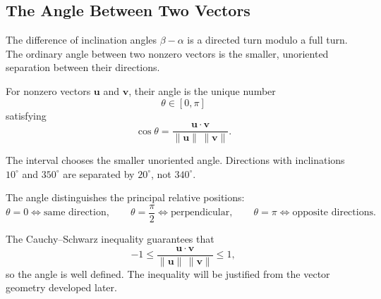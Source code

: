 \subsection{The Angle Between Two Vectors}

\begin{corebox}
The difference of inclination angles $\beta-\alpha$ is a directed turn modulo a
full turn. The ordinary angle between two nonzero vectors is the smaller,
unoriented separation between their directions.
\end{corebox}

\begin{definitionbox}
For nonzero vectors $\mathbf u$ and $\mathbf v$, their angle is the unique number
\[
\theta\in[0,\pi]
\]
satisfying
\[
\boxed{
\cos\theta
=
\frac{\mathbf u\cdot\mathbf v}
{\|\mathbf u\|\,\|\mathbf v\|}
}.
\]
\end{definitionbox}

\begin{interpretationbox}
The interval chooses the smaller unoriented angle. Directions with inclinations
$10^\circ$ and $350^\circ$ are separated by $20^\circ$, not $340^\circ$.
\end{interpretationbox}

\begin{theorembox}
The angle distinguishes the principal relative positions:
\[
\theta=0 \iff \text{same direction},
\qquad
\theta=\frac{\pi}{2} \iff \text{perpendicular},
\qquad
\theta=\pi \iff \text{opposite directions}.
\]
\end{theorembox}

\begin{remarkbox}
The Cauchy--Schwarz inequality guarantees that
\[
-1\leq
\frac{\mathbf u\cdot\mathbf v}{\|\mathbf u\|\,\|\mathbf v\|}
\leq1,
\]
so the angle is well defined. The inequality will be justified from the vector
geometry developed later.
\end{remarkbox}
